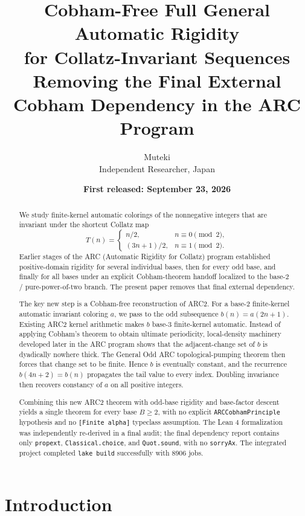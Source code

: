 \documentclass[11pt]{article}
\title{\textbf{Cobham-Free Full General Automatic Rigidity\\
for Collatz-Invariant Sequences}\\[0.4em]
\large Removing the Final External Cobham Dependency in the ARC Program}
\author{Muteki\\
Independent Researcher, Japan}
\date{\textbf{First released: September 23, 2026}}
\theoremstyle{remark}
\begin{document}
\maketitle

\begin{abstract}
We study finite-kernel automatic colorings of the nonnegative integers that are
invariant under the shortcut Collatz map
\[
T(n)=
\begin{cases}
n/2, & n\equiv 0\pmod 2,\\[2mm]
(3n+1)/2, & n\equiv 1\pmod 2.
\end{cases}
\]
Earlier stages of the ARC (Automatic Rigidity for Collatz) program established
positive-domain rigidity for several individual bases, then for every odd base,
and finally for all bases under an explicit Cobham-theorem handoff localized to
the base-$2$ / pure-power-of-two branch.  The present paper removes that final
external dependency.

The key new step is a Cobham-free reconstruction of ARC2.  For a base-$2$
finite-kernel automatic invariant coloring $a$, we pass to the odd subsequence
$b(n)=a(2n+1)$.  Existing ARC2 kernel arithmetic makes $b$ base-$3$
finite-kernel automatic.  Instead of applying Cobham's theorem to obtain
ultimate periodicity, local-density machinery developed later in the ARC
program shows that the adjacent-change set of $b$ is dyadically nowhere thick.
The General Odd ARC topological-pumping theorem then forces that change set to
be finite.  Hence $b$ is eventually constant, and the recurrence
$b(4n+2)=b(n)$ propagates the tail value to every index.  Doubling invariance
then recovers constancy of $a$ on all positive integers.

Combining this new ARC2 theorem with odd-base rigidity and base-factor descent
yields a single theorem for every base $B\ge 2$, with no explicit
\texttt{ARCCobhamPrinciple} hypothesis and no \texttt{[Finite alpha]}
typeclass assumption.  The Lean 4 formalization was independently re-derived
in a final audit; the final dependency report contains only
\texttt{propext}, \texttt{Classical.choice}, and \texttt{Quot.sound}, with no
\texttt{sorryAx}.  The integrated project completed \texttt{lake build}
successfully with 8906 jobs.
\end{abstract}

\section{Introduction}
\end{document}
